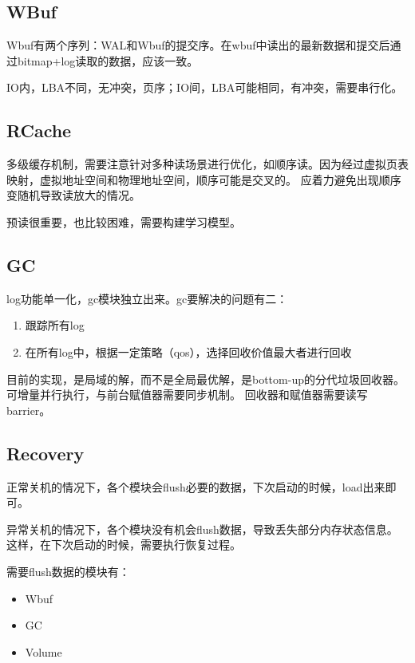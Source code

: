 \documentclass[UTF8]{ctexart}
\begin{document}
\subsection{WBuf}

Wbuf有两个序列：WAL和Wbuf的提交序。在wbuf中读出的最新数据和提交后通过bitmap+log读取的数据，应该一致。

IO内，LBA不同，无冲突，页序；IO间，LBA可能相同，有冲突，需要串行化。

\subsection{RCache}

多级缓存机制，需要注意针对多种读场景进行优化，如顺序读。因为经过虚拟页表映射，虚拟地址空间和物理地址空间，顺序可能是交叉的。
应着力避免出现顺序变随机导致读放大的情况。

预读很重要，也比较困难，需要构建学习模型。

\subsection{GC}

log功能单一化，gc模块独立出来。gc要解决的问题有二：
\begin{enumerate}
    \item 跟踪所有log
    \item 在所有log中，根据一定策略（qos），选择回收价值最大者进行回收
\end{enumerate}

目前的实现，是局域的解，而不是全局最优解，是bottom-up的分代垃圾回收器。可增量并行执行，与前台赋值器需要同步机制。
回收器和赋值器需要读写barrier。

\subsection{Recovery}

正常关机的情况下，各个模块会flush必要的数据，下次启动的时候，load出来即可。

异常关机的情况下，各个模块没有机会flush数据，导致丢失部分内存状态信息。
这样，在下次启动的时候，需要执行恢复过程。

需要flush数据的模块有：
\begin{itemize}
    \item Wbuf
    \item GC
    \item Volume
\end{itemize}
\end{document}
